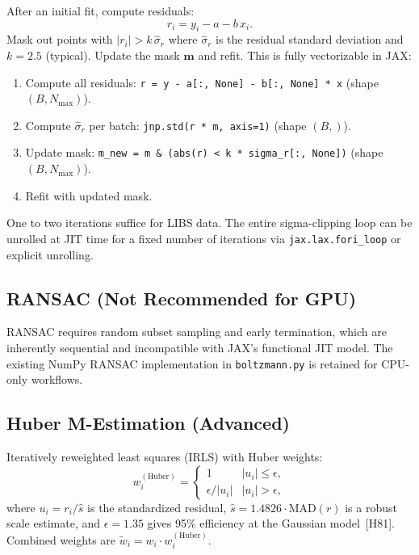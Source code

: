 \documentclass[11pt]{article}
\begin{document}
After an initial fit, compute residuals:
\begin{equation}
  r_i = y_i - a - b\,x_i.
  \label{eq:residuals}
\end{equation}
Mask out points with $|r_i| > k\,\hat{\sigma}_r$ where $\hat{\sigma}_r$
is the residual standard deviation and $k = 2.5$ (typical). Update the mask
$\mathbf{m}$ and refit. This is fully vectorizable in JAX:
\begin{enumerate}
  \item Compute all residuals: \texttt{r = y - a[:, None] - b[:, None] * x} (shape $(B, N_{\max})$).
  \item Compute $\hat{\sigma}_r$ per batch: \texttt{jnp.std(r * m, axis=1)} (shape $(B,)$).
  \item Update mask: \texttt{m\_new = m \& (abs(r) < k * sigma\_r[:, None])} (shape $(B, N_{\max})$).
  \item Refit with updated mask.
\end{enumerate}
One to two iterations suffice for LIBS data. The entire sigma-clipping loop
can be unrolled at JIT time for a fixed number of iterations via
\texttt{jax.lax.fori\_loop} or explicit unrolling.

\subsection{RANSAC (Not Recommended for GPU)}

RANSAC requires random subset sampling and early termination, which are
inherently sequential and incompatible with JAX's functional JIT model.
The existing NumPy RANSAC implementation in \texttt{boltzmann.py} is retained
for CPU-only workflows.

\subsection{Huber M-Estimation (Advanced)}

Iteratively reweighted least squares (IRLS) with Huber weights:
\begin{equation}
  w_i^{(\text{Huber})} = \begin{cases}
    1 & |u_i| \leq \epsilon, \\
    \epsilon / |u_i| & |u_i| > \epsilon,
  \end{cases}
  \label{eq:huber_weights}
\end{equation}
where $u_i = r_i / \hat{s}$ is the standardized residual,
$\hat{s} = 1.4826 \cdot \text{MAD}(r)$ is a robust scale estimate, and
$\epsilon = 1.35$ gives 95\% efficiency at the Gaussian model~[H81].
Combined weights are $\tilde{w}_i = w_i \cdot w_i^{(\text{Huber})}$.
\end{document}
